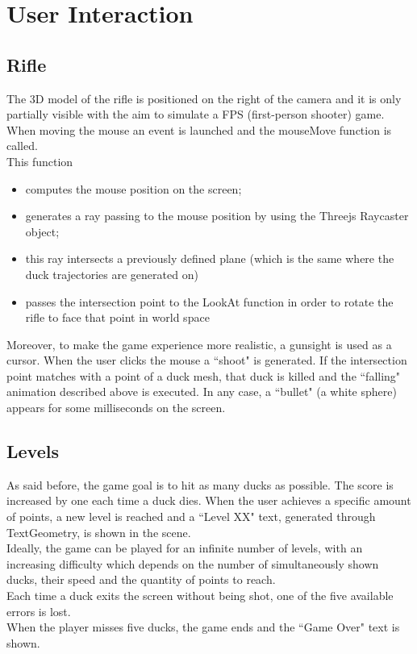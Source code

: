 \documentclass[12pt,a4paper]{article}
\begin{document}
	
	\section{User Interaction} \label{user}
	\subsection{Rifle}
	The 3D model of the rifle is positioned on the right of the camera and it is only partially visible with the aim to simulate a FPS (first-person shooter) game.
	When moving the mouse an event is launched and the mouseMove function is called.\\
	This function
	\begin{itemize}
		\item computes the mouse position on the screen;
		\item generates a ray passing to the mouse position by using the Threejs Raycaster object;
		\item this ray intersects a previously defined plane (which is the same where the duck trajectories are generated on)
		\item passes the intersection point to the LookAt function in order to rotate the rifle to face that point in world space
	\end{itemize}
	Moreover, to make the game experience more realistic, a gunsight is used as a cursor. 
	When the user clicks the mouse a ``shoot" is generated. If the intersection point matches with a point of a duck mesh, that duck is killed and the ``falling" animation described above is executed. In any case, a ``bullet" (a white sphere) appears for some milliseconds on the screen.
	
	\subsection{Levels}
	As said before, the game goal is to hit as many ducks as possible. The score is increased by one each time a duck dies. When the user achieves a specific amount of points, a new level is reached and a ``Level XX" text, generated through TextGeometry, is shown in the scene.\\
	Ideally, the game can be played for an infinite number of levels, with an increasing difficulty which depends on the number of simultaneously shown ducks, their speed and the quantity of points to reach.\\
	Each time a duck exits the screen without being shot, one of the five available errors is lost.\\ When the player misses five ducks, the game ends and the ``Game Over" text is shown.
	
\end{document}
